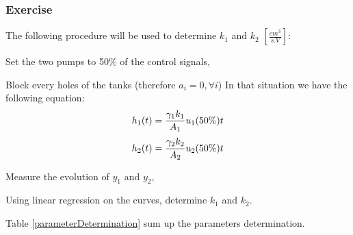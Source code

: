 \subsubsection{Exercise}

The following procedure will be used to determine $k_1$ and $k_2$ $\left[\frac{cm^3}{s.V}\right]$:

\begin{shortitemize}
    \item Set the two pumps to 50\% of the control signals,
    \item Block every holes of the tanks (therefore $a_i = 0, \forall i$)
        In that situation we have the following equation:
            $$
            h_1(t) = \frac{\gamma_1k_1}{A_1}u_1(50\%)t \\
            $$
            $$
            h_2(t) = \frac{\gamma_2k_2}{A_2}u_2(50\%)t \\
            $$
    \item Measure the evolution of $y_1$ and $y_2$,
    \item Using linear regression on the curves, determine $k_1$ and $k_2$.
\end{shortitemize}

Table \ref{parameterDetermination} sum up the parameters determination.


